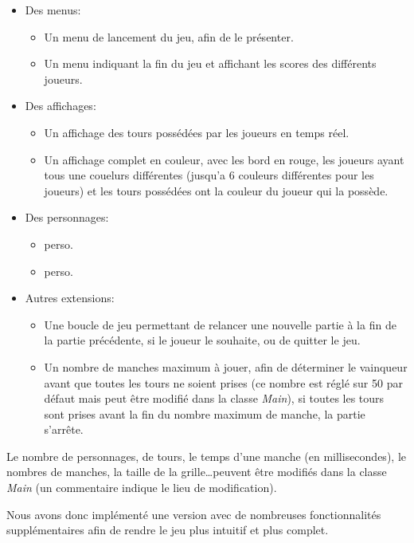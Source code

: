\begin{itemize}
    \item Des menus:
    \begin{itemize}
        \item Un menu de lancement du jeu, afin de le présenter.
        \item Un menu indiquant la fin du jeu et affichant les scores des différents joueurs.
    \end{itemize} 

    \item Des affichages:
    \begin{itemize}
        \item Un affichage des tours possédées par les joueurs en temps réel.
        \item Un affichage complet en couleur, avec les bord en rouge, les joueurs ayant tous une couelurs différentes (jusqu'a 6 couleurs différentes pour les joueurs) et les tours possédées ont la couleur du joueur qui la possède.
    \end{itemize} 

    \item Des personnages:
    \begin{itemize}
        \item \textcolor{cardinal}{perso}.
        \item \textcolor{cardinal}{perso}.
    \end{itemize}

    \item Autres extensions:
    \begin{itemize}
        \item Une boucle de jeu permettant de relancer une nouvelle partie à la fin de la partie précédente, si le joueur le souhaite, ou de quitter le jeu.
        \item Un nombre de manches maximum à jouer, afin de déterminer le vainqueur avant que toutes les tours ne soient prises (ce nombre est réglé sur 50 par défaut mais peut être modifié dans la classe \textit{Main}), si toutes les tours sont prises avant la fin du nombre maximum de manche, la partie s'arrête.
    \end{itemize}
\end{itemize}
\bigskip

Le nombre de personnages, de tours, le temps d'une manche (en millisecondes), le nombres de manches, la taille de la grille\dots peuvent être modifiés dans la classe \textit{Main} (un commentaire indique le lieu de modification).
\bigskip

Nous avons donc implémenté une version avec de nombreuses fonctionnalités supplémentaires afin de rendre le jeu plus intuitif et plus complet.